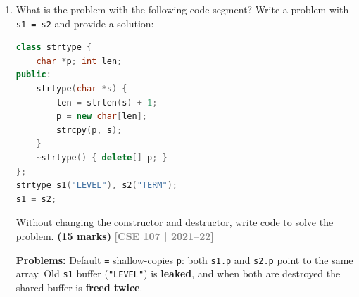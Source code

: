 \documentclass[12pt,a3paper]{article}
\newcommand{\yr}[1]{\hfill\textcolor{gray}{\small\textbf{[#1]}}}
\newcommand{\mk}[1]{\textcolor{orange!70!black}{\small\textbf{(#1 marks)}}}
\begin{document}
\begin{enumerate}
\begin{tcolorbox}[enhanced,breakable,ansbox,colback=cE!4,colframe=cE,
  boxrule=0.8pt,arc=5pt,
  title={\textbf{Answer --- One-line new/delete statements}},
  fonttitle=\bfseries\color{white},colbacktitle=cE]

\begin{enumerate}[label=(\alph*)]
  \item \begin{lstlisting}[language=C++]
char *cp = new char('E');
\end{lstlisting}
  \item \begin{lstlisting}[language=C++]
float *fp = new float[5];
\end{lstlisting}
  \item \begin{lstlisting}[language=C++]
delete[] a;
\end{lstlisting}
  \item \begin{lstlisting}[language=C++]
A *ap = new A;
\end{lstlisting}
\end{enumerate}

\end{tcolorbox}

\item What is the problem with the following code segment? Write a problem with \texttt{s1 = s2} and provide a solution:
\begin{lstlisting}[language=C++]
class strtype {
    char *p; int len;
public:
    strtype(char *s) {
        len = strlen(s) + 1;
        p = new char[len];
        strcpy(p, s);
    }
    ~strtype() { delete[] p; }
};
strtype s1("LEVEL"), s2("TERM");
s1 = s2;
\end{lstlisting}
Without changing the constructor and destructor, write code to solve the problem. \mk{15}
\yr{CSE 107 | 2021--22}

\begin{tcolorbox}[enhanced,breakable,ansbox,colback=cE!4,colframe=cE,
  boxrule=0.8pt,arc=5pt,
  title={\textbf{Answer --- strtype s1=s2 problem and overloaded = solution}},
  fonttitle=\bfseries\color{white},colbacktitle=cE]

\textbf{Problems:} Default \texttt{=} shallow-copies \texttt{p}:
both \texttt{s1.p} and \texttt{s2.p} point to the same array.
Old \texttt{s1} buffer (\texttt{"LEVEL"}) is \textbf{leaked}, and
when both are destroyed the shared buffer is \textbf{freed twice}.


\end{tcolorbox}
\end{enumerate}
\end{document}
